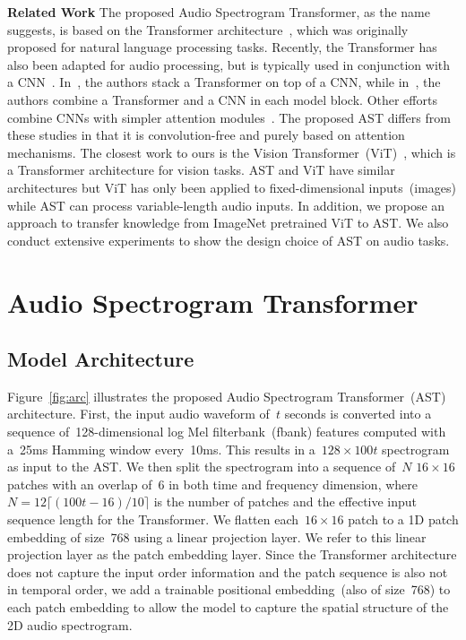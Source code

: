 \documentclass[a4paper]{article}
\begin{document}
\textbf{Related Work} The proposed Audio Spectrogram Transformer, as the name suggests, is based on the Transformer architecture~\cite{vaswani2017attention}, which was originally proposed for natural language processing tasks. Recently, the Transformer has also been adapted for audio processing, but is typically used in conjunction with a CNN~\cite{miyazaki2020convolution,kong2020sound,gulati2020conformer}. In~\cite{miyazaki2020convolution,kong2020sound}, the authors stack a Transformer on top of a CNN, while in~\cite{gulati2020conformer}, the authors combine a Transformer and a CNN in each model block. Other efforts combine CNNs with simpler attention modules~\cite{gong2021psla,kong2020panns,rybakov2020streaming}. The proposed AST differs from these studies in that it is convolution-free and purely based on attention mechanisms. The closest work to ours is the Vision Transformer~(ViT)~\cite{dosovitskiy2021image,touvron2020deit,yuan2021tokens}, which is a Transformer architecture for vision tasks. AST and ViT have similar architectures but ViT has only been applied to fixed-dimensional inputs~(images) while AST can process variable-length audio inputs. In addition, we propose an approach to transfer knowledge from ImageNet pretrained ViT to AST. We also conduct extensive experiments to show the design choice of AST on audio tasks. 


\section{Audio Spectrogram Transformer}
\subsection{Model Architecture}
\label{sec:arc}

Figure~\ref{fig:arc} illustrates the proposed Audio Spectrogram Transformer~(AST) architecture.
First, the input audio waveform of~$t$ seconds is converted into a sequence of~128-dimensional log Mel filterbank~(fbank) features computed with a~25ms Hamming window every~10ms.
This results in a~$128\times100t$ spectrogram as input to the AST.
We then split the spectrogram into a sequence of~$N$ $16\times16$ patches with an overlap of~6 in both time and frequency dimension, where $N=12\lceil{(100t-16)/10}\rceil$ is the number of patches and the effective input sequence length for the Transformer.
We flatten each~$16\times16$ patch to a 1D patch embedding of size~768 using a linear projection layer.
We refer to this linear projection layer as the patch embedding layer.
Since the Transformer architecture does not capture the input order information and the patch sequence is also not in temporal order, we add a trainable positional embedding~(also of size~768) to each patch embedding to allow the model to capture the spatial structure of the 2D audio spectrogram.
\end{document}
